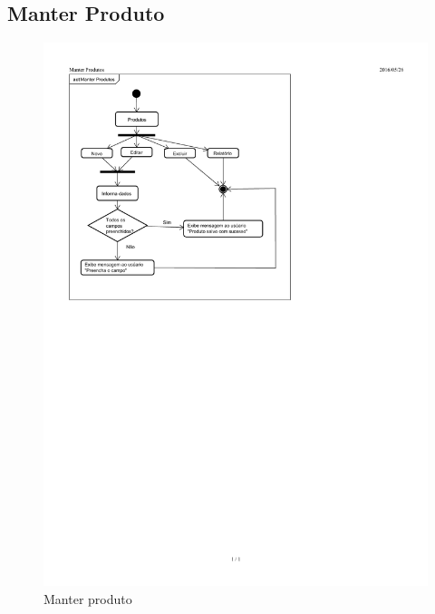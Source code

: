 \documentclass[chapter=TITLE,12pt,oneside,a4paper,english,french,sumario=tradicional,spanish,brazil,]{abntex2}
\begin{document}
\subsection{Manter Produto}
\begin{figure}[h]\centering
	\includegraphics[scale=1.48]{produto.pdf}\caption{Manter produto}
\end{figure}


\newpage
\end{document}
